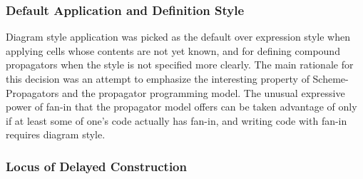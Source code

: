 \documentclass[12pt,letterpaper,english]{article}
\begin{document}
\subsubsection{Default Application and Definition Style}
\label{default-application-and-definition-style}

Diagram style application was picked as the default over
expression style when applying cells whose contents are not yet known,
and for defining compound propagators when the style is not specified
more clearly.  The main rationale for this decision was an attempt to
emphasize the interesting property of Scheme-Propagators and the
propagator programming model.  The unusual expressive power of fan-in
that the propagator model offers can be taken advantage of only if at
least some of one's code actually has fan-in, and writing code with
fan-in requires diagram style.



\subsubsection{Locus of Delayed Construction}
\label{locus-of-delayed-construction}
\end{document}
